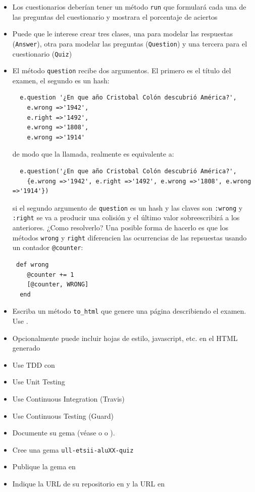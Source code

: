 \begin{itemize}
\begin{verbatim}
************************
\end{verbatim}
\item Los cuestionarios deberían tener un método \verb|run| que formulará
cada una de las preguntas del cuestionario y mostrara el porcentaje de aciertos
\item Puede que le interese crear tres clases, una para modelar las respuestas (\verb|Answer|),
otra para modelar las preguntas (\verb|Question|) y una tercera para el cuestionario (\verb|Quiz|)
\item  El método \verb|question| recibe dos argumentos. El primero es el título del examen, el segundo es un hash:
\begin{verbatim}
  e.question '¿En que año Cristobal Colón descubrió América?',
    e.wrong =>'1942',
    e.right =>'1492',
    e.wrong =>'1808',
    e.wrong =>'1914'
\end{verbatim}
de modo que la llamada, realmente es equivalente a:
\begin{verbatim}
  e.question('¿En que año Cristobal Colón descubrió América?',
    {e.wrong =>'1942', e.right =>'1492', e.wrong =>'1808', e.wrong =>'1914'})
\end{verbatim}
si el segundo argumento de \verb|question| es un hash y las claves son \verb|:wrong| y \verb|:right| se va a 
producir una colisión y el último valor sobreescribirá a los anteriores. ¿Como resolverlo?
Una posible forma de hacerlo es que los métodos \verb|wrong| y \verb|right| diferencien las ocurrencias de las repsuestas
usando un contador \verb|@counter|:
\begin{verbatim}
 def wrong
    @counter += 1
    [@counter, WRONG]
  end
\end{verbatim}
\item Escriba un método \verb|to_html| que genere una página describiendo el examen. Use \ERB{}. 
\item
Opcionalmente
puede incluir hojas de estilo, javascript, etc. en el HTML generado
\item Use TDD con \rspec{}
\item Use Unit Testing
\item Use Continuous Integration (Travis)
\item Use Continuous Testing (Guard)
\item Documente su gema (véase
o
o 
). 
\item Cree una gema \verb|ull-etsii-aluXX-quiz|
\item Publique la gema en \rubygems{}
\item Indique la URL de su repositorio en \github{} y la URL en \rubygems{}
\end{itemize}



